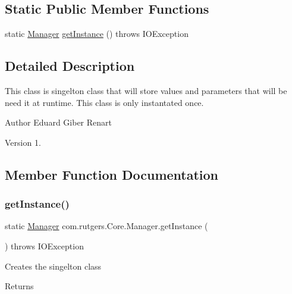 \subsection*{Static Public Member Functions}
\begin{DoxyCompactItemize}
\item 
static \hyperlink{classcom_1_1rutgers_1_1Core_1_1Manager}{Manager} \hyperlink{classcom_1_1rutgers_1_1Core_1_1Manager_ab0493d895017b9cb16f383a2f9915a78}{get\+Instance} ()  throws I\+O\+Exception 
\end{DoxyCompactItemize}


\subsection{Detailed Description}
This class is singelton class that will store values and parameters that will be need it at runtime. This class is only instantated once.

\begin{DoxyAuthor}{Author}
Eduard Giber Renart 
\end{DoxyAuthor}
\begin{DoxyVersion}{Version}
1. 
\end{DoxyVersion}


\subsection{Member Function Documentation}
\mbox{\label{classcom_1_1rutgers_1_1Core_1_1Manager_ab0493d895017b9cb16f383a2f9915a78}} 
\subsubsection{\texorpdfstring{get\+Instance()}{getInstance()}}
{\footnotesize\ttfamily static \hyperlink{classcom_1_1rutgers_1_1Core_1_1Manager}{Manager} com.\+rutgers.\+Core.\+Manager.\+get\+Instance (\begin{DoxyParamCaption}{ }\end{DoxyParamCaption}) throws I\+O\+Exception\hspace{0.3cm}{\ttfamily [static]}}

Creates the singelton class \begin{DoxyReturn}{Returns}

\end{DoxyReturn}

